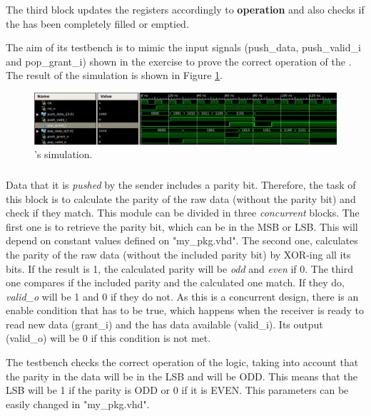 \documentclass[12pt]{article}
\begin{document}
The third block updates the registers accordingly to \textbf{operation} and also checks if the \fifo has been completely filled or emptied.

The aim of its testbench is to mimic the input signals (push\_data, push\_valid\_i and pop\_grant\_i) shown in the exercise to prove the correct operation of the \fifo.  The result of the simulation is shown in Figure \ref{fig: FIFO simulation}.

\begin{figure}[ht]
\centering
\includegraphics[width=15cm]{images/fifo-simulation}
\caption{\label{fig: FIFO simulation} \fifo's simulation.}
\end{figure}

\subsubsection{\paritycheck}
\label{subsubsection: Parity Check}

Data that it is \textit{pushed} by the sender includes a parity bit. Therefore, the task of this block is to calculate the parity of the raw data (without the parity bit) and check if they match. This module can be divided in three \textit{concurrent} blocks. The first one is to retrieve the parity bit, which can be in the MSB or LSB. This will depend on constant values defined on "my\_pkg.vhd". The second one, calculates the parity of the raw data (without the included parity bit) by XOR-ing all its bits. If the result is 1, the calculated parity will be \textit{odd} and \textit{even} if 0. The third one compares if the included parity and the calculated one match. If they do, \textit{valid\_o} will be 1 and 0 if they do not. As this is a concurrent design, there is an enable condition that has to be true, which happens when the receiver is ready to read new data (grant\_i) and the \fifo has data available (valid\_i).  Its output (valid\_o) will be 0 if this condition is not met.

The testbench checks the correct operation of the logic, taking into account that the parity in the data will be in the LSB and will be ODD.  This means that the LSB will be 1 if the parity is ODD or 0 if it is EVEN. This parameters can be easily changed in "my\_pkg.vhd".  
\end{document}

